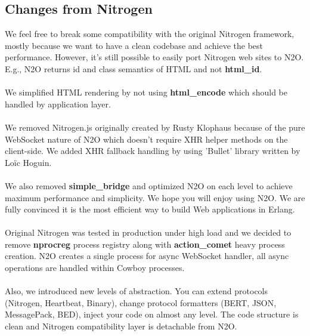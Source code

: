 \subsection*{Changes from Nitrogen}
We feel free to break some compatibility with the original
Nitrogen framework, mostly because we want to have a clean codebase
and achieve the best performance. However, it's still possible to easily port
Nitrogen web sites to N2O. E.g., N2O returns id and class semantics
of HTML and not {\bf html\_id}.

\paragraph{}
We simplified HTML rendering by not using
{\bf html\_encode} which should be handled by application layer.

\paragraph{}
We removed Nitrogen.js originally created by Rusty Klophaus
because of the pure WebSocket nature of N2O which doesn't
require XHR helper methods on the client-side. We added XHR fallback
handling by using 'Bullet' library written by Loïc Hoguin.

\paragraph{}
We also removed {\bf simple\_bridge} and optimized N2O on each level to
achieve maximum performance and simplicity. We hope you will enjoy
using N2O. We are fully convinced it is the most efficient way to
build Web applications in Erlang.

\paragraph{}
Original Nitrogen was tested in production under high load and we
decided to remove {\bf nprocreg} process registry along 
with {\bf{action\_comet}} heavy process creation. N2O creates a single
process for async WebSocket handler, all async operations
are handled within Cowboy processes.

\paragraph{}
Also, we introduced new levels of abstraction. You can extend
protocols (Nitrogen, Heartbeat, Binary), change protocol formatters (BERT,
JSON, MessagePack, BED), inject your code on almost any level. The code structure
is clean and Nitrogen compatibility layer is detachable from N2O.

